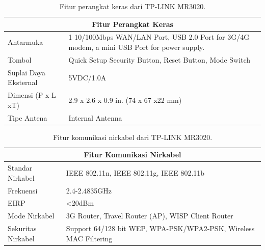     \begin{table}[H]
    \centering
    \caption{Fitur perangkat keras dari TP-LINK MR3020.}
    \label{mr3020-hardware-feature}
    \begin{tabular}{|l|p{10cm}|}
    \hline
    \multicolumn{2}{|c|}{Fitur Perangkat Keras}                                                                                                \\ \hline
    Antarmuka             & 1 10/100Mbps WAN/LAN Port, USB 2.0 Port for 3G/4G modem, a mini USB Port for power supply.   \\ \hline
    Tombol                & Quick Setup Security Button, Reset Button, Mode Switch                                                             \\ \hline
    Suplai Daya Eksternal & 5VDC/1.0A                                                                                                          \\ \hline
    Dimensi (P x L xT)    & 2.9 x 2.6 x 0.9 in. (74 x 67 x22 mm)                                                                               \\ \hline
    Tipe Antena           & Internal Antenna                                                                                                   \\ \hline
    \end{tabular}
    \end{table}

    \begin{table}[H]
    \centering
    \caption{Fitur komunikasi nirkabel dari TP-LINK MR3020.}
    \label{mr3020-wireless-feature}
    \begin{tabular}{|l|p{10cm}|}
    \hline
    \multicolumn{2}{|c|}{Fitur Komunikasi Nirkabel}                                         \\ \hline
    Standar Nirkabel   & IEEE 802.11n, IEEE 802.11g, IEEE 802.11b                           \\ \hline
    Frekuensi          & 2.4-2.4835GHz                                                      \\ \hline
    EIRP               & <20dBm                                                             \\ \hline
    Mode Nirkabel      & 3G Router, Travel Router (AP), WISP Client Router                  \\ \hline
    Sekuritas Nirkabel & Support 64/128 bit WEP, WPA-PSK/WPA2-PSK, Wireless MAC Filtering   \\ \hline
    \end{tabular}
    \end{table}

